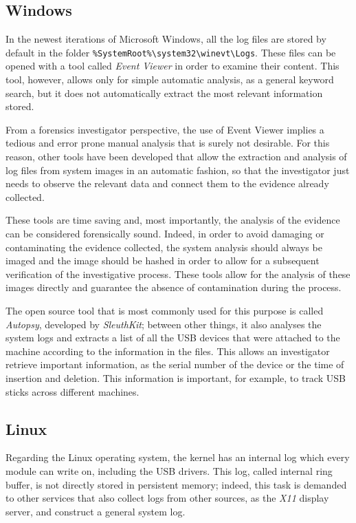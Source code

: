 \documentclass[a4paper]{article}
\begin{document}
\subsection{Windows}\label{sec:litWindows}
In the newest iterations of Microsoft Windows, all the log files are stored by
default in the folder
\texttt{\%SystemRoot\%\textbackslash{}system32\textbackslash{}winevt\textbackslash{}Logs}.
These files can be opened with a tool called \emph{Event Viewer} in order to
examine their content. This tool, however, allows only for simple automatic
analysis, as a general keyword search, but it does not automatically extract
the most relevant information stored.

From a forensics investigator perspective, the use of Event Viewer implies a
tedious and error prone manual analysis that is surely not desirable. For this
reason, other tools have been developed that allow the extraction and analysis
of log files from system images in an automatic fashion, so that the
investigator just needs to observe the relevant data and connect them to the
evidence already collected.

These tools are time saving and, most importantly, the analysis of the evidence
can be considered forensically sound. Indeed, in order to avoid damaging or
contaminating the evidence collected, the system analysis should always be
imaged and the image should be hashed in order to allow for a subsequent
verification of the investigative process. These tools allow for the analysis of
these images directly and guarantee the absence of contamination during the
process.~\cite{murphey2007automated}

The open source tool that is most commonly used for this purpose is called
\emph{Autopsy}, developed by \emph{SleuthKit}; between other things, it also
analyses the system logs and extracts a list of all the USB devices that were
attached to the machine according to the information in the files. This allows
an investigator retrieve important information, as the serial number of the
device or the time of insertion and deletion. This information is important, for
example, to track USB sticks across different machines.~\cite{deb2015usb}

\subsection{Linux}
Regarding the Linux operating system, the kernel has an internal log which every
module can write on, including the USB drivers. This log, called internal ring
buffer, is not directly stored in persistent memory; indeed, this task is
demanded to other services that also collect logs from other sources, as the
\emph{X11} display server, and construct a general system log.
\end{document}
